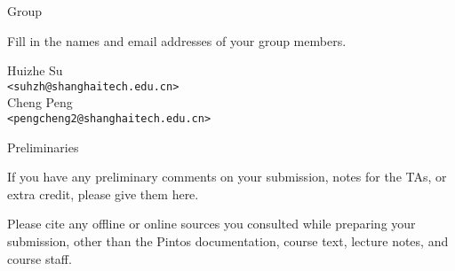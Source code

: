 


\begin{titlepage} %

  \begin{center}
  \end{center}
  \vfill %

  \begin{aspect}{Group}
    \begin{tcolorbox}
      \large
      Fill in the names and email addresses of your group members.
    \end{tcolorbox}
    \centering
    \large
    \vspace{0.1cm}
    Huizhe Su\\
    \texttt{<suhzh@shanghaitech.edu.cn>}\\
    Cheng Peng\\
    \texttt{<pengcheng2@shanghaitech.edu.cn>}
  \end{aspect}

  \begin{aspect}{Preliminaries}
    \begin{tcolorbox}
      If you have any preliminary comments on your submission, notes for the
      TAs, or extra credit, please give them here.

      Please cite any offline or online sources you consulted while
      preparing your submission, other than the Pintos documentation, course
      text, lecture notes, and course staff.
    \end{tcolorbox}
  \end{aspect}

\end{titlepage}
